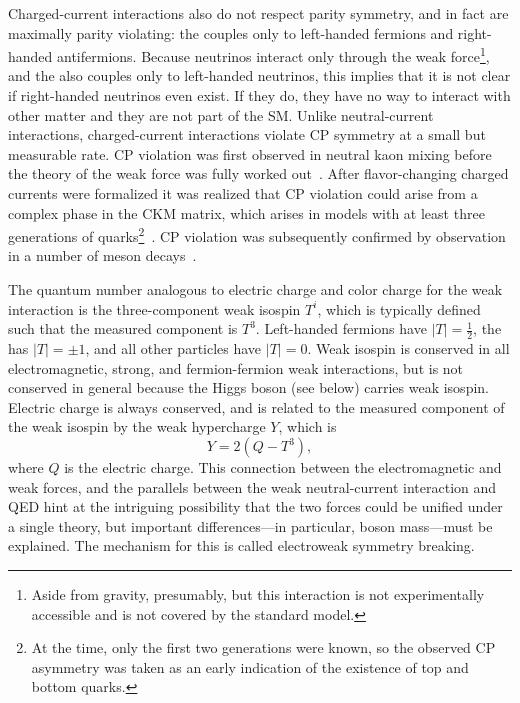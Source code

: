 Charged-current interactions also do not respect parity symmetry, and in fact are maximally parity violating: the {\PW} couples only to left-handed fermions and right-handed antifermions.
Because neutrinos interact only through the weak force\footnote{Aside from gravity, presumably, but this interaction is not experimentally accessible and is not covered by the standard model.}, and the {\PZ} also couples only to left-handed neutrinos, this implies that it is not clear if right-handed neutrinos even exist.
If they do, they have no way to interact with other matter and they are not part of the SM\@.
Unlike neutral-current interactions, charged-current interactions violate CP symmetry at a small but measurable rate.
CP violation was first observed in neutral kaon mixing before the theory of the weak force was fully worked out~\cite{PhysRevLett.13.138}.
After flavor-changing charged currents were formalized it was realized that CP violation could arise from a complex phase in the CKM matrix, which arises in models with at least three generations of quarks\footnote{At the time, only the first two generations were known, so the observed CP asymmetry was taken as an early indication of the existence of top and bottom quarks.}~\cite{doi:10.1143/PTP.49.652}.
CP violation was subsequently confirmed by observation in a number of meson decays~\cite{AlaviHarati:1999xp,Fanti:1999nm,Aubert:2001sp,Abe:2001xe,Aaij:2012kz,Aaij:2013iua}.

The quantum number analogous to electric charge and color charge for the weak interaction is the three-component weak isospin $T^i$, which is typically defined such that the measured component is $T^3$.
Left-handed fermions have $\lvert T \rvert = \frac{1}{2}$, the {\PWpm} has $\lvert T \rvert = \pm 1$, and all other particles have $\lvert T \rvert = 0$.
Weak isospin is conserved in all electromagnetic, strong, and fermion-fermion weak interactions, but is not conserved in general because the Higgs boson (see below) carries weak isospin.
Electric charge is always conserved, and is related to the measured component of the weak isospin by the weak hypercharge $Y$, which is
\begin{equation}
  Y = 2\left(Q - T^3\right),
\end{equation}
where $Q$ is the electric charge.
This connection between the electromagnetic and weak forces, and the parallels between the weak neutral-current interaction and QED hint at the intriguing possibility that the two forces could be unified under a single theory, but important differences---in particular, boson mass---must be explained.
The mechanism for this is called electroweak symmetry breaking.



